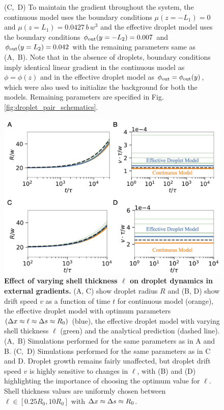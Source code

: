 \begin{figure}[tb]
{\mbox{(C, D)}
To maintain the gradient throughout the system, the continuous model uses the boundary conditions $\mu(z=-L_1) = 0$ and $\mu(z = L_1)= 0.0427\,b\,w^3$ and the effective droplet model uses the boundary conditions $\phi_\mathrm{out}(y = -L_2) = 0.007$ and $\phi_\mathrm{out}(y = L_2) = 0.042$ with the remaining parameters same as \mbox{(A, B)}.
Note that in the absence of droplets, boundary conditions imply identical linear gradient in the continuous model as $\phi = \phi(z)$ and in the effective droplet model as $\phi_\mathrm{out} = \phi_\mathrm{out}(y)$, which were also used to initialize the background for both the models.
Remaining parameters are specified in Fig. \ref{fig:droplet_pair_schematics}.
}
\label{fig:drop_in_gradient}
\end{figure}

\clearpage

\begin{figure}[tb]
\centering
\includegraphics[scale=0.5]{MainContent/Figures/drop_in_gradient_all.pdf}
\caption{
\textbf{Effect of varying shell thickness $\ell$ on droplet dynamics in external gradients.}
(A, C) show droplet radius $R$ and (B, D) show drift speed $v$ as a function of time $t$ for continuous model (orange), the effective droplet model with optimum parameters $(\Delta x \approx \ell \approx \Delta s \approx R_0)$ (blue), the effective droplet model with varying shell thickness $\ell$ (green) and the analytical prediction (dashed line).
\mbox{(A, B)} Simulations performed for the same parameters as in A and B.
\mbox{(C, D)} Simulations performed for the same parameters as in C and D.
Droplet growth remains fairly unaffected, but droplet drift speed $v$ is highly sensitive to changes in $\ell$, with (B) and (D) highlighting the importance of choosing the optimum value for $\ell$.
Shell thickness values are uniformly chosen between $\ell \in [0.25 R_0, 10R_0]$ with $\Delta x \approx \Delta s \approx R_0$.
}
\label{fig:drop_in_gradient_all}
\end{figure}

